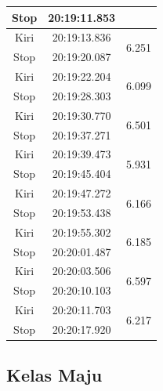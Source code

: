 \begin{longtable}{|c|c|c|}
  Stop           & 20:19:11.853        &                         \\ \hline
  Kiri           & 20:19:13.836        & \multirow{2}{*}{6.251}  \\ \cline{1-2}
  Stop           & 20:19:20.087        &                         \\ \hline
  Kiri           & 20:19:22.204        & \multirow{2}{*}{6.099}  \\ \cline{1-2}
  Stop           & 20:19:28.303        &                         \\ \hline
  Kiri           & 20:19:30.770        & \multirow{2}{*}{6.501}  \\ \cline{1-2}
  Stop           & 20:19:37.271        &                         \\ \hline
  Kiri           & 20:19:39.473        & \multirow{2}{*}{5.931}  \\ \cline{1-2}
  Stop           & 20:19:45.404        &                         \\ \hline
  Kiri           & 20:19:47.272        & \multirow{2}{*}{6.166}  \\ \cline{1-2}
  Stop           & 20:19:53.438        &                         \\ \hline
  Kiri           & 20:19:55.302        & \multirow{2}{*}{6.185}  \\ \cline{1-2}
  Stop           & 20:20:01.487        &                         \\ \hline
  Kiri           & 20:20:03.506        & \multirow{2}{*}{6.597}  \\ \cline{1-2}
  Stop           & 20:20:10.103        &                         \\ \hline
  Kiri           & 20:20:11.703        & \multirow{2}{*}{6.217}  \\ \cline{1-2}
  Stop           & 20:20:17.920        &                         \\ \hline
\end{longtable}

\subsection{Kelas Maju}

